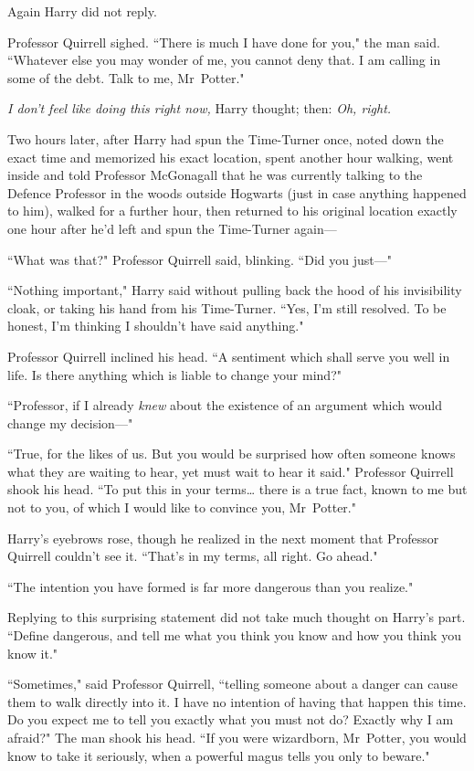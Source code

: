 Again Harry did not reply.

Professor Quirrell sighed. ``There is much I have done for you," the man said. ``Whatever else you may wonder of me, you cannot deny that. I am calling in some of the debt. Talk to me, Mr~Potter."

\emph{I don't feel like doing this right now,} Harry thought; then: \emph{Oh, right.}

\later

Two hours later, after Harry had spun the Time-Turner once, noted down the exact time and memorized his exact location, spent another hour walking, went inside and told Professor McGonagall that he was currently talking to the Defence Professor in the woods outside Hogwarts (just in case anything happened to him), walked for a further hour, then returned to his original location exactly one hour after he'd left and spun the Time-Turner again—

\later

``What was that?" Professor Quirrell said, blinking. ``Did you just—"

``Nothing important," Harry said without pulling back the hood of his invisibility cloak, or taking his hand from his Time-Turner. ``Yes, I'm still resolved. To be honest, I'm thinking I shouldn't have said anything."

Professor Quirrell inclined his head. ``A sentiment which shall serve you well in life. Is there anything which is liable to change your mind?"

``Professor, if I already \emph{knew} about the existence of an argument which would change my decision—"

``True, for the likes of us. But you would be surprised how often someone knows what they are waiting to hear, yet must wait to hear it said." Professor Quirrell shook his head. ``To put this in your terms{\ldots} there is a true fact, known to me but not to you, of which I would like to convince you, Mr~Potter."

Harry's eyebrows rose, though he realized in the next moment that Professor Quirrell couldn't see it. ``That's in my terms, all right. Go ahead."

``The intention you have formed is far more dangerous than you realize."

Replying to this surprising statement did not take much thought on Harry's part. ``Define dangerous, and tell me what you think you know and how you think you know it."

``Sometimes," said Professor Quirrell, ``telling someone about a danger can cause them to walk directly into it. I have no intention of having that happen this time. Do you expect me to tell you exactly what you must not do? Exactly why I am afraid?" The man shook his head. ``If you were wizardborn, Mr~Potter, you would know to take it seriously, when a powerful magus tells you only to beware."

